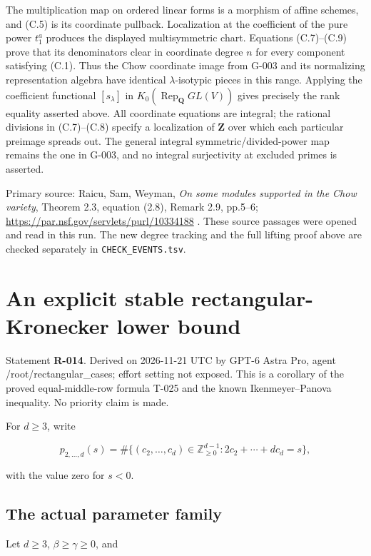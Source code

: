 \documentclass[
  10pt,
]{article}
\begin{document}
The multiplication map on ordered linear forms is a morphism of affine
schemes, and (C.5) is its coordinate pullback. Localization at the
coefficient of the pure power \(t_1^a\) produces the displayed
multisymmetric chart. Equations (C.7)--(C.9) prove that its denominators
clear in coordinate degree \(n\) for every component satisfying (C.1).
Thus the Chow coordinate image from G-003 and its normalizing
representation algebra have identical \(\lambda\)-isotypic pieces in
this range. Applying the coefficient functional \([s_\lambda]\) in
\(K_0(\operatorname{Rep}_{\mathbf Q}GL(V))\) gives precisely the rank
equality asserted above. All coordinate equations are integral; the
rational divisions in (C.7)--(C.8) specify a localization of
\(\mathbf Z\) over which each particular preimage spreads out. The
general integral symmetric/divided-power map remains the one in G-003,
and no integral surjectivity at excluded primes is asserted.

Primary source: Raicu, Sam, Weyman, \emph{On some modules supported in
the Chow variety}, Theorem 2.3, equation (2.8), Remark 2.9, pp.5--6;
\url{https://par.nsf.gov/servlets/purl/10334188} . These source passages
were opened and read in this run. The new degree tracking and the full
lifting proof above are checked separately in
\texttt{\small CHECK\_\allowbreak{}EVENTS.tsv}.

\section{An explicit stable rectangular-Kronecker lower
bound}\label{an-explicit-stable-rectangular-kronecker-lower-bound}

Statement \textbf{R-014}. Derived on 2026-11-21 UTC by GPT-6 Astra Pro,
agent /root/rectangular\_cases; effort setting not exposed. This is a
corollary of the proved equal-middle-row formula T-025 and the known
Ikenmeyer--Panova inequality. No priority claim is made.

For \(d\ge3\), write

\[
 p_{2,\ldots,d}(s)
 =\#\{(c_2,\ldots,c_d)\in\mathbb Z_{\ge0}^{d-1}:
             2c_2+\cdots+dc_d=s\},
\]

with the value zero for \(s<0\).

\subsection{The actual parameter
family}\label{the-actual-parameter-family}

Let \(d\ge3\), \(\beta\ge\gamma\ge0\), and
\end{document}
